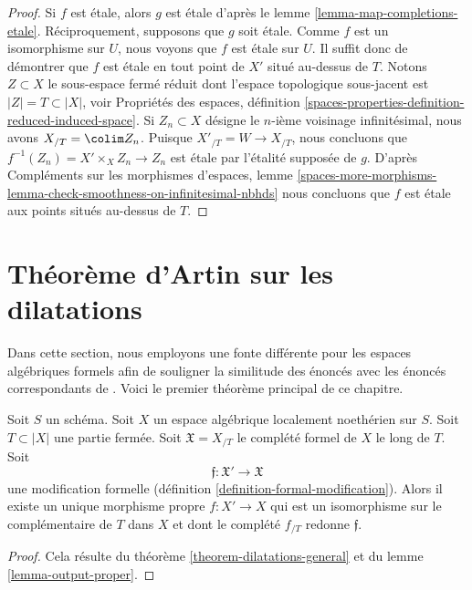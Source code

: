 \begin{proof}
Si $f$ est étale, alors $g$ est étale d'après le
lemme \ref{lemma-map-completions-etale}.
Réciproquement, supposons que $g$ soit étale.
Comme $f$ est un isomorphisme sur $U$, nous voyons que $f$ est étale
sur $U$. Il suffit donc de démontrer que $f$ est étale
en tout point de $X'$ situé au-dessus de $T$. Notons $Z \subset X$
le sous-espace fermé réduit dont l'espace topologique sous-jacent
est $|Z| = T \subset |X|$, voir
Propriétés des espaces, définition
\ref{spaces-properties-definition-reduced-induced-space}.
Si $Z_n \subset X$ désigne le $n$-ième voisinage infinitésimal,
nous avons $X_{/T} = \colim Z_n$. Puisque $X'_{/T} = W \to X_{/T}$,
nous concluons que $f^{-1}(Z_n) = X' \times_X Z_n \to Z_n$
est étale par l'étalité supposée de $g$.
D'après Compléments sur les morphismes d'espaces, lemme
\ref{spaces-more-morphisms-lemma-check-smoothness-on-infinitesimal-nbhds}
nous concluons que $f$ est étale aux points situés au-dessus de $T$.
\end{proof}





\section{Théorème d'Artin sur les dilatations}
\label{section-dilatations}

\noindent
Dans cette section, nous employons une fonte différente pour les espaces
algébriques formels afin de souligner la similitude des énoncés avec les
énoncés correspondants de \cite{ArtinII}. Voici le premier théorème principal
de ce chapitre.

\begin{theorem}
\label{theorem-dilatations}
\begin{reference}
\cite[Theorem 3.2]{ArtinII}
\end{reference}
Soit $S$ un schéma. Soit $X$ un espace algébrique localement noethérien sur
$S$. Soit $T \subset |X|$ une partie fermée. Soit
$\mathfrak X = X_{/T}$
le complété formel de $X$ le long de $T$. Soit
$$
\mathfrak f : \mathfrak X' \to \mathfrak X
$$
une modification formelle (définition \ref{definition-formal-modification}).
Alors il existe un unique morphisme propre $f : X' \to X$ qui est un
isomorphisme sur le complémentaire de $T$ dans $X$ et dont le complété
$f_{/T}$ redonne $\mathfrak f$.
\end{theorem}

\begin{proof}
Cela résulte du théorème \ref{theorem-dilatations-general}
et du lemme \ref{lemma-output-proper}.
\end{proof}

